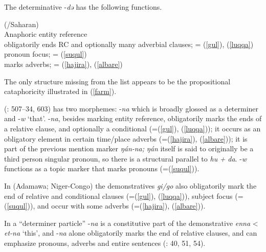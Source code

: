 \documentclass[output=paper]{langsci/langscibook}
\begin{document}
The  determinative -\textit{də} has the following functions.


\ea\label{kanuri}
{}{}{ (/Saharan)}\\

{}{}{Anaphoric entity reference}\\
  \ea
{}{}{obligatorily ends RC and optionally many adverbial clauses}; = (\ref{gul}), (\ref{luqqa})\\
\ex
{}{}{pronoun focus}; = (\ref{suqul})\\
\ex
{}{}{marks adverbs}; = (\ref{hajira}), (\ref{albare})\\
\z
\z

The only  structure missing from the list appears to be the propositional cataphoricity illustrated in (\ref{farm}).

 (\citealt{Frajzyngier2012}: 507–34, 603) has two morphemes: -\textit{na} which is broadly glossed as a determiner and -\textit{w} ‘that’. -\textit{na}, besides marking entity reference, obligatorily marks the ends of a {relative} clause, and optionally a {conditional} (=(\ref{gul}), (\ref{luqqa})); it occurs as an obligatory element in certain time/place adverbs (=(\ref{hajira}), (\ref{albare})); it is part of the previous mention marker \textit{ŋán-na;} \textit{ŋán} itself is said to originally be a third person singular pronoun, so there is a structural parallel to \textit{hu} \textit{+} \textit{da}. -\textit{w} functions as a topic marker that marks pronouns (=(\ref{suqul})).

In  (Adamawa; Niger-Congo) the {demonstratives} \textit{gi/go} also obligatorily mark the end of {relative} and {conditional} clauses (=(\ref{gul}), (\ref{luqqa})), subject focus (=(\ref{suqul})), and occur with some adverbs (=(\ref{hajira}), (\ref{albare})).

In  a “determiner particle” -\textit{na} is a constitutive part of the demonstrative \textit{enna} < \textit{et-na} ‘this’, and -\textit{na} alone obligatorily marks the end of {relative} clauses, and can emphasize pronouns, adverbs and entire sentences (\citealt{Stevenson1969}: 40, 51, 54).
\end{document}
